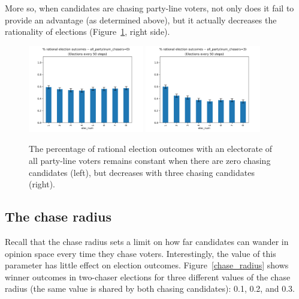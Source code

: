 More so, when candidates are chasing party-line voters, not only does it fail to provide an 
advantage (as determined above), but it actually decreases the rationality of elections 
(Figure~\ref{all_party_hurt_rat}, right side).

\begin{figure}
\centering
\includegraphics[width=0.45\textwidth]{assets/all_party_0_chasers_rationality_stays_same.png}
\includegraphics[width=0.45\textwidth]{assets/all_party_3_chasers_rationality_decreases.png}
	\caption{The percentage of rational election outcomes with an electorate of all party-line voters 
	remains constant when there are zero chasing candidates (left), but decreases with three chasing
	candidates (right).}
	\label{all_party_hurt_rat}
\end{figure}


\subsection{The chase radius}

Recall that the chase radius sets a limit on how far candidates can wander in
opinion space every time they chase voters. Interestingly, the value of this
parameter has little effect on election outcomes. Figure~\ref{chase_radius}
shows winner outcomes in two-chaser elections for three different values of the
chase radius (the same value is shared by both chasing candidates): 0.1, 0.2,
and 0.3.

